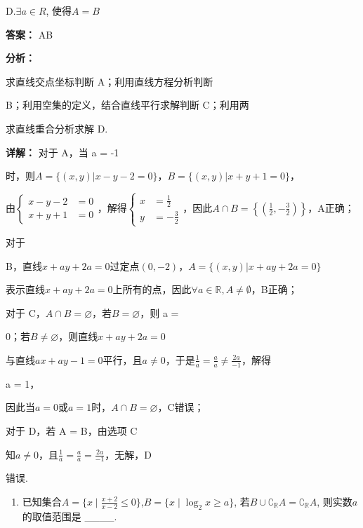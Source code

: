 \documentclass[11pt,a4paper]{ctexart}
\begin{document}
D.\(\exists a \in R\), 使得\(A = B\)

\textbf{答案：}
AB

\textbf{分析：}

求直线交点坐标判断 A；利用直线方程分析判断

B；利用空集的定义，结合直线平行求解判断 C；利用两

求直线重合分析求解 D.

\textbf{详解：}
对于 A，当 a = -1

时，则\(A = \{(x, y) | x - y - 2 = 0\}\)，\(B = \{(x, y) | x + y + 1 = 0\}\)，

由\(\left\{\begin{aligned}x-y-2&=0\\ x+y+1&=0\end{aligned}\right.\)，解得\(\left\{\begin{aligned}x&=\frac{1}{2}\\ y&=-\frac{3}{2}\end{aligned}\right.\)，因此\(A\cap B=\left\{(\frac{1}{2},-\frac{3}{2})\right\}\)，A正确；

对于

B，直线\(x + ay + 2a = 0\)过定点\((0, -2)\)，\(A = \{(x, y) | x + ay + 2a = 0\}\)

表示直线\(x + ay + 2a = 0\)上所有的点，因此\(\forall a \in \mathbb{R}, A \neq \emptyset\)，B正确；

对于 C，\(A \cap B = \varnothing\)，若\(B = \varnothing\)，则 a =

0；若\(B \neq \varnothing\)，则直线\(x + ay + 2a = 0\)

与直线\(ax + ay - 1 = 0\)平行，且\(a \neq 0\)，于是\(\frac{1}{a} = \frac{a}{a} \neq \frac{2a}{-1}\)，解得

a = 1，

因此当\(a = 0\)或\(a = 1\)时，\(A \cap B = \varnothing\)，C错误；

对于 D，若 A = B，由选项 C

知\(a \neq 0\)，且\(\frac{1}{a} = \frac{a}{a} = \frac{2a}{-1}\)，无解，D

错误.

\begin{enumerate}[label=\arabic*., leftmargin=*, start=8]
\item 已知集合\(A = \{x \mid \frac{x + 2}{x - 2} \leq 0\}\),\(B = \{x \mid \log_2 x \geq a\}\),
  若\(B\cup \complement_{\mathbb{R}}A=\complement_{\mathbb{R}}A\), 则实数\(a\)的取值范围是
  \_\_\_\_.
\end{enumerate}
\end{document}
